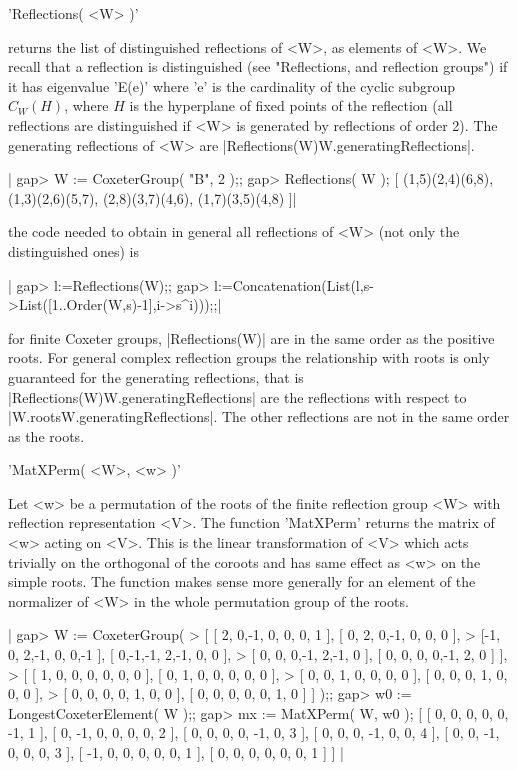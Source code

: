
'Reflections( <W> )'

returns  the list of distinguished reflections  of <W>, as elements of <W>.
We  recall  that  a  reflection  is  distinguished  (see  "Reflections, and
reflection   groups")  if  it  has  eigenvalue  'E(e)'  where  'e'  is  the
cardinality of the cyclic subgroup $C_W(H)$, where $H$ is the hyperplane of
fixed points of the reflection (all reflections are distinguished if <W> is
generated by reflections of order 2). The generating reflections of <W> are
|Reflections(W){W.generatingReflections}|.

|    gap> W := CoxeterGroup( "B", 2 );;
    gap> Reflections( W );
    [ (1,5)(2,4)(6,8), (1,3)(2,6)(5,7), (2,8)(3,7)(4,6), (1,7)(3,5)(4,8) ]|

the  code needed to obtain in general  all reflections of <W> (not only the
distinguished ones) is\:

|    gap> l:=Reflections(W);;
    gap> l:=Concatenation(List(l,s->List([1..Order(W,s)-1],i->s^i)));;|

for  finite Coxeter groups,  |Reflections(W)| are in  the same order as the
positive roots. For general complex reflection groups the relationship with
roots   is  only  guaranteed  for   the  generating  reflections,  that  is
|Reflections(W){W.generatingReflections}|  are the reflections with respect
to |W.roots{W.generatingReflections}|. The other reflections are not in the
same order as the roots.


'MatXPerm( <W>, <w> )'

Let  <w> be a permutation  of the roots of  the finite reflection group <W>
with  reflection representation  <V>. The  function 'MatXPerm'  returns the
matrix of <w> acting on <V>. This is the linear transformation of <V> which
acts  trivially on the orthogonal of the coroots and has same effect as <w>
on the simple roots. The function makes sense more generally for an element
of the normalizer of <W> in the whole permutation group of the roots.

|    gap> W := CoxeterGroup(
    > [ [ 2, 0,-1, 0, 0, 0, 1 ], [ 0, 2, 0,-1, 0, 0, 0 ],
    >   [-1, 0, 2,-1, 0, 0,-1 ], [ 0,-1,-1, 2,-1, 0, 0 ],
    >   [ 0, 0, 0,-1, 2,-1, 0 ], [ 0, 0, 0, 0,-1, 2, 0 ] ],
    > [ [ 1, 0, 0, 0, 0, 0, 0 ], [ 0, 1, 0, 0, 0, 0, 0 ],
    >   [ 0, 0, 1, 0, 0, 0, 0 ], [ 0, 0, 0, 1, 0, 0, 0 ],
    >   [ 0, 0, 0, 0, 1, 0, 0 ], [ 0, 0, 0, 0, 0, 1, 0 ] ] );;
    gap> w0 := LongestCoxeterElement( W );;
    gap> mx := MatXPerm( W, w0 );
    [ [ 0, 0, 0, 0, 0, -1, 1 ], [ 0, -1, 0, 0, 0, 0, 2 ],
      [ 0, 0, 0, 0, -1, 0, 3 ], [ 0, 0, 0, -1, 0, 0, 4 ],
      [ 0, 0, -1, 0, 0, 0, 3 ], [ -1, 0, 0, 0, 0, 0, 1 ],
      [ 0, 0, 0, 0, 0, 0, 1 ] ] |

